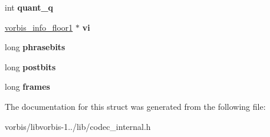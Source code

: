 \begin{DoxyCompactItemize}
\item 
\hypertarget{structvorbis__look__floor1_adac4ee5bff92d47ed24050b19c4cf01b}{int {\bfseries quant\+\_\+q}}\label{structvorbis__look__floor1_adac4ee5bff92d47ed24050b19c4cf01b}

\item 
\hypertarget{structvorbis__look__floor1_ade3db5b54943aea50868288f4d077a34}{\hyperlink{structvorbis__info__floor1}{vorbis\+\_\+info\+\_\+floor1} $\ast$ {\bfseries vi}}\label{structvorbis__look__floor1_ade3db5b54943aea50868288f4d077a34}

\item 
\hypertarget{structvorbis__look__floor1_a10403077a7c2ffb6c8c1e94278621076}{long {\bfseries phrasebits}}\label{structvorbis__look__floor1_a10403077a7c2ffb6c8c1e94278621076}

\item 
\hypertarget{structvorbis__look__floor1_a0f1524a3ee7ca6d2e1aea806119a0c60}{long {\bfseries postbits}}\label{structvorbis__look__floor1_a0f1524a3ee7ca6d2e1aea806119a0c60}

\item 
\hypertarget{structvorbis__look__floor1_a78bec579433dd07b15e2479d53b5d957}{long {\bfseries frames}}\label{structvorbis__look__floor1_a78bec579433dd07b15e2479d53b5d957}

\end{DoxyCompactItemize}


The documentation for this struct was generated from the following file\+:\begin{DoxyCompactItemize}
\item 
vorbis/libvorbis-\/1../lib/codec\+\_\+internal.\+h\end{DoxyCompactItemize}
